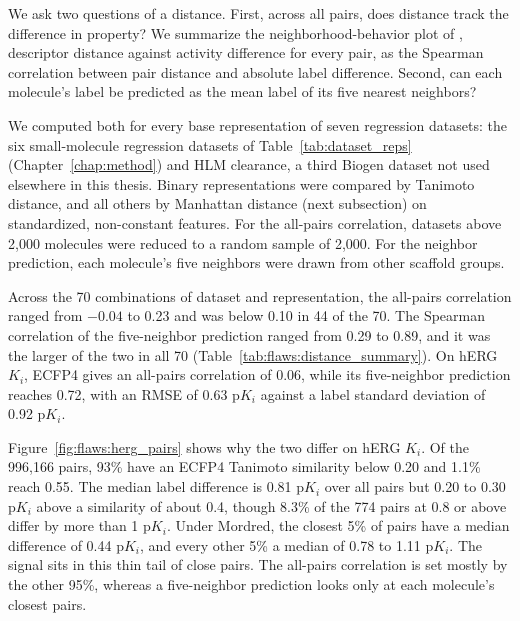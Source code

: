 We ask two questions of a distance. First, across all pairs, does distance track the difference in property? We summarize the neighborhood-behavior plot of \citet{Patterson1996}, descriptor distance against activity difference for every pair, as the Spearman correlation between pair distance and absolute label difference. Second, can each molecule's label be predicted as the mean label of its five nearest neighbors?

We computed both for every base representation of seven regression datasets: the six small-molecule regression datasets of Table~\ref{tab:dataset_reps} (Chapter~\ref{chap:method}) and HLM clearance, a third Biogen dataset not used elsewhere in this thesis. Binary representations were compared by Tanimoto distance, and all others by Manhattan distance (next subsection) on standardized, non-constant features. For the all-pairs correlation, datasets above 2,000 molecules were reduced to a random sample of 2,000. For the neighbor prediction, each molecule's five neighbors were drawn from other scaffold groups.

Across the 70 combinations of dataset and representation, the all-pairs correlation ranged from $-0.04$ to 0.23 and was below 0.10 in 44 of the 70. The Spearman correlation of the five-neighbor prediction ranged from 0.29 to 0.89, and it was the larger of the two in all 70 (Table~\ref{tab:flaws:distance_summary}). On hERG $K_i$, ECFP4 gives an all-pairs correlation of 0.06, while its five-neighbor prediction reaches 0.72, with an RMSE of 0.63 p$K_i$ against a label standard deviation of 0.92 p$K_i$.

Figure~\ref{fig:flaws:herg_pairs} shows why the two differ on hERG $K_i$. Of the 996,166 pairs, 93\% have an ECFP4 Tanimoto similarity below 0.20 and 1.1\% reach 0.55. The median label difference is 0.81 p$K_i$ over all pairs but 0.20 to 0.30 p$K_i$ above a similarity of about 0.4, though 8.3\% of the 774 pairs at 0.8 or above differ by more than 1 p$K_i$. Under Mordred, the closest 5\% of pairs have a median difference of 0.44 p$K_i$, and every other 5\% a median of 0.78 to 1.11 p$K_i$. The signal sits in this thin tail of close pairs. The all-pairs correlation is set mostly by the other 95\%, whereas a five-neighbor prediction looks only at each molecule's closest pairs.

